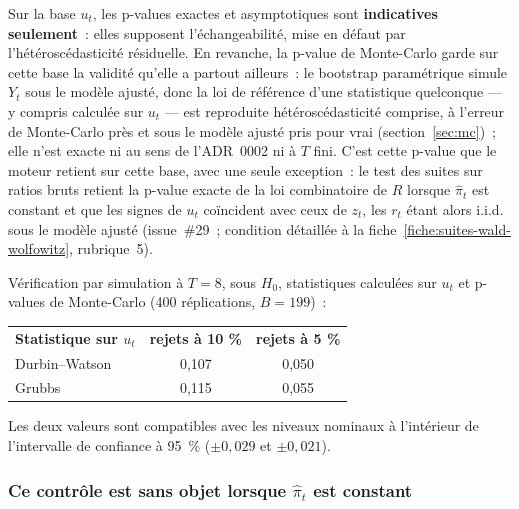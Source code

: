 \documentclass[a4paper,11pt]{article}
\begin{document}
Sur la base $u_t$, les p-values exactes et asymptotiques sont \textbf{indicatives
seulement}~: elles supposent l'échangeabilité, mise en défaut par
l'hétéroscédasticité résiduelle. En revanche, la p-value de Monte-Carlo garde sur
cette base la validité qu'elle a partout ailleurs~: le bootstrap paramétrique simule
$Y_t$ sous le modèle ajusté, donc la loi de référence d'une statistique quelconque ---
y compris calculée sur $u_t$ --- est reproduite hétéroscédasticité comprise, à l'erreur
de Monte-Carlo près et sous le modèle ajusté pris pour vrai (section~\ref{sec:mc})~;
elle n'est exacte ni au sens de l'ADR~0002 ni à $T$ fini. C'est cette p-value que le moteur retient sur cette base, avec une
seule exception~: le test des suites sur ratios bruts retient la p-value exacte
de la loi combinatoire de $R$ lorsque $\hat\pi_t$ est constant et que les
signes de $u_t$ coïncident avec ceux de $z_t$, les $r_t$ étant alors i.i.d.
sous le modèle ajusté (issue~\#29~; condition détaillée à la
fiche~\ref{fiche:suites-wald-wolfowitz}, rubrique~5).

Vérification par simulation à $T = 8$, sous $H_0$, statistiques calculées sur
$u_t$ et p-values de Monte-Carlo (400 réplications, $B = 199$)~:

\begin{center}
\small
{}
\begin{tabular}{@{}p{5.0cm}cc@{}}
\rowcolor{tableheader}
\textcolor{financeblue}{\textbf{Statistique sur $u_t$}} &
\textcolor{financeblue}{\textbf{rejets à 10 \%}} &
\textcolor{financeblue}{\textbf{rejets à 5 \%}} \\
Durbin--Watson & 0,107 & 0,050 \\
Grubbs         & 0,115 & 0,055 \\
\end{tabular}
\end{center}

\noindent
Les deux valeurs sont compatibles avec les niveaux nominaux à l'intérieur de
l'intervalle de confiance à 95~\% ($\pm 0{,}029$ et $\pm 0{,}021$).

\subsubsection*{Ce contrôle est sans objet lorsque $\hat\pi_t$ est constant}
\end{document}
